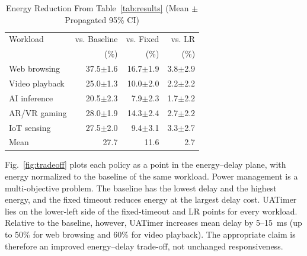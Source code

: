 \documentclass[journal]{IEEEtran}
\begin{document}
\begin{table}[t]
\caption{Energy Reduction From Table~\ref{tab:results} (Mean $\pm$ Propagated 95\% CI)}
\label{tab:derived}
\centering
\begin{tabular}{lrrr}
\toprule
Workload & vs. Baseline & vs. Fixed & vs. LR \\
 & (\%) & (\%) & (\%) \\
\midrule
Web browsing & 37.5$\pm$1.6 & 16.7$\pm$1.9 & 3.8$\pm$2.9 \\
Video playback & 25.0$\pm$1.3 & 10.0$\pm$2.0 & 2.2$\pm$2.2 \\
AI inference & 20.5$\pm$2.3 & 7.9$\pm$2.3 & 1.7$\pm$2.2 \\
AR/VR gaming & 28.0$\pm$1.9 & 14.3$\pm$2.4 & 2.7$\pm$2.2 \\
IoT sensing & 27.5$\pm$2.0 & 9.4$\pm$3.1 & 3.3$\pm$2.7 \\
\midrule
Mean & 27.7 & 11.6 & 2.7 \\
\bottomrule
\end{tabular}
\end{table}

Fig.~\ref{fig:tradeoff} plots each policy as a point in the energy--delay plane, with energy normalized to the baseline of the same workload. Power management is a multi-objective problem. The baseline has the lowest delay and the highest energy, and the fixed timeout reduces energy at the largest delay cost. UATimer lies on the lower-left side of the fixed-timeout and LR points for every workload. Relative to the baseline, however, UATimer increases mean delay by 5--15~ms (up to 50\% for web browsing and 60\% for video playback). The appropriate claim is therefore an improved energy--delay trade-off, not unchanged responsiveness.
\end{document}
